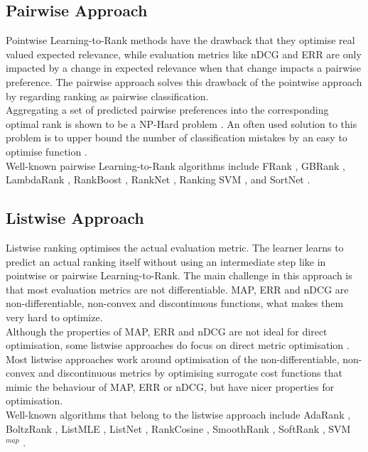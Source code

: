 \subsection{Pairwise Approach}
Pointwise Learning-to-Rank methods have the drawback that they optimise real valued expected relevance, while evaluation metrics like \ac{nDCG} and \ac{ERR} are only impacted by a change in expected relevance when that change impacts a pairwise preference. The pairwise approach solves this drawback of the pointwise approach by regarding ranking as pairwise classification.\\

Aggregating a set of predicted pairwise preferences into the corresponding optimal rank is shown to be a NP-Hard problem \cite{Feldman2012}. An often used solution to this problem is to upper bound the number of classification mistakes by an easy to optimise function \cite{Bartlett2006}.\\

Well-known pairwise Learning-to-Rank algorithms include FRank \cite{Tsai2007}, GBRank \cite{Zheng2007}, LambdaRank \cite{Burges2006}, RankBoost \cite{Freund2003}, RankNet \cite{Burges2005}, Ranking \acs{SVM} \cite{Herbrich1999b,Joachims2002}, and SortNet \cite{Rigutini2008}.
\subsection{Listwise Approach}
Listwise ranking optimises the actual evaluation metric. The learner learns to predict an actual ranking itself without using an intermediate step like in pointwise or pairwise Learning-to-Rank. The main challenge in this approach is that most evaluation metrics are not differentiable. \ac{MAP}, \ac{ERR} and \ac{nDCG} are non-differentiable, non-convex and discontinuous functions, what makes them very hard to optimize.\\

Although the properties of \ac{MAP}, \ac{ERR} and \ac{nDCG} are not ideal for direct optimisation, some listwise approaches do focus on direct metric optimisation \cite{Yue2007, Taylor2008, Chapelle2010}. Most listwise approaches work around optimisation of the non-differentiable, non-convex and discontinuous metrics by optimising surrogate cost functions that mimic the behaviour of \ac{MAP}, \ac{ERR} or \ac{nDCG}, but have nicer properties for optimisation.\\

Well-known algorithms that belong to the listwise approach include AdaRank \cite{Xu2007}, BoltzRank \cite{Volkovs2009}, ListMLE \cite{Xia2008}, ListNet \cite{Cao2007}, RankCosine \cite{Qin2008}, SmoothRank \cite{Chapelle2010}, SoftRank \cite{Taylor2008}, \acs{SVM}$^{map}$ \cite{Yue2007}.